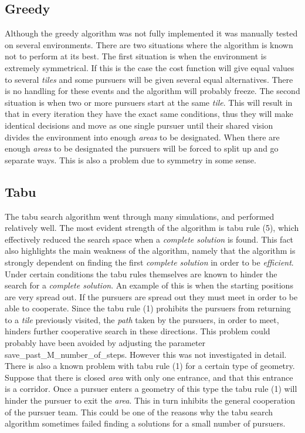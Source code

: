 \subsection{Greedy}
Although the greedy algorithm was not fully implemented it was manually tested on several environments. There are two situations where the algorithm is known not to perform at its best. The first situation is when the environment is extremely symmetrical. If this is the case the cost function will give equal values to several \emph{tiles} and some pursuers will be given several equal alternatives. There is no handling for these events and the algorithm will probably freeze. The second situation is when two or more pursuers start at the same \emph{tile}. This will result in that in every iteration they have the exact same conditions, thus they will make identical decisions and move as one single pursuer until their shared vision divides the environment into enough \emph{areas} to be designated. When there are enough \emph{areas} to be designated the pursuers will be forced to split up and go separate ways. This is also a problem due to symmetry in some sense.
\subsection{Tabu}
The tabu search algorithm went through many simulations, and performed relatively well. The most evident strength of the algorithm is tabu rule (5), which effectively reduced the search space when a \emph{complete solution} is found. This fact also highlights the main weakness of the algorithm, namely that the algorithm is strongly dependent on finding the first \emph{complete solution} in order to be \emph{efficient}. Under certain conditions the tabu rules themselves are known to hinder the search for a \emph{complete solution}. An example of this is when the starting positions are very spread out.  If the pursuers are spread out they must meet in order to be able to cooperate. Since the tabu rule (1) prohibits the pursuers from returning to a \emph{tile} previously visited, the \emph{path} taken by the pursuers, in order to meet, hinders further cooperative search in these directions. This problem could probably have been avoided by adjusting the parameter save\_past\_M\_number\_of\_steps. However this was not investigated in detail. There is also a known problem with tabu rule (1) for a certain type of geometry. Suppose that there is closed \emph{area} with only one entrance, and that this entrance is a corridor. Once a pursuer enters a geometry of this type the tabu rule (1) will hinder the pursuer to exit the \emph{area}. This in turn inhibits the general cooperation of the pursuer team. This could be one of the reasons why the tabu search algorithm sometimes failed finding a solutions for a small number of pursuers.

